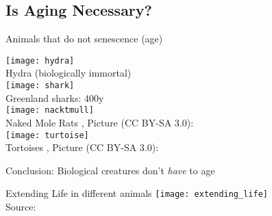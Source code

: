 \subsection{Is Aging Necessary?}


\begin{frame}[c]{Animals that do not senescence (age)}
    \scriptsize
    \begin{multicols}{2}
        \texttt{[image: hydra]} \\
        Hydra (biologically immortal) \cite{martinez1998mortality} \\
        \pause
        \texttt{[image: shark]} \\
        Greenland sharks: 400y \cite{Greenlan67:online} \\
        \pause
        \texttt{[image: nacktmull]} \\
        Naked Mole Rats \cite{ruby2018naked},
        Picture (CC BY-SA 3.0): \cite{Nacktmul31:online} \\
        \pause
        \texttt{[image: turtoise]} \\
        Tortoises \cite{miller2001escaping},
        Picture (CC BY-SA 3.0): \cite{Tortoise98:online} \\
    \end{multicols}
    \pause
    \large
    Conclusion: Biological creatures don't {\em have} to age
\end{frame}



\begin{frame}[c]{Extending Life in different animals}
    \texttt{[image: extending\_life]} \\
    Source: \cite{bulterijs2015time}
\end{frame}
